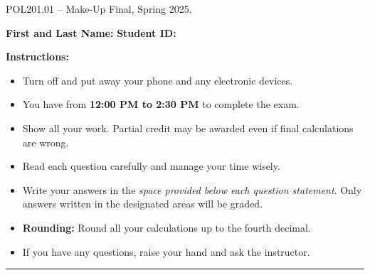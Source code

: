 \documentclass{article}
\begin{document}
 \hspace{1em} \vspace{-1.7em} %
\begin{center}
   \Large    POL201.01 -- Make-Up Final, Spring 2025.
\end{center}

\vspace{1em}
\noindent\textbf{First and Last Name:} \underline{\hspace{8cm}}  \quad  \textbf{Student ID:} \underline{\hspace{4.4cm}}

\vspace{0.7em}
\noindent\textbf{Instructions:}

\vspace{-0.8em}
\begin{itemize}
    \setlength{\itemsep}{-0.35em}
    \item Turn off and put away your phone and any electronic devices.
    \item You have from \textbf{12:00 PM to 2:30 PM} to complete the exam.
    \item Show all your work. Partial credit may be awarded even if final calculations are wrong.
    \item Read each question carefully and manage your time wisely.
    \item Write your answers in the \emph{space provided below each question statement}. Only answers written in the designated areas will be graded.
    \item \textbf{Rounding:} Round all your calculations up to the fourth decimal.
    \item If you have any questions, raise your hand and ask the instructor.
\end{itemize}
\vspace{-1.1em}
\noindent\rule{\linewidth}{0.4pt} %

\end{document}
